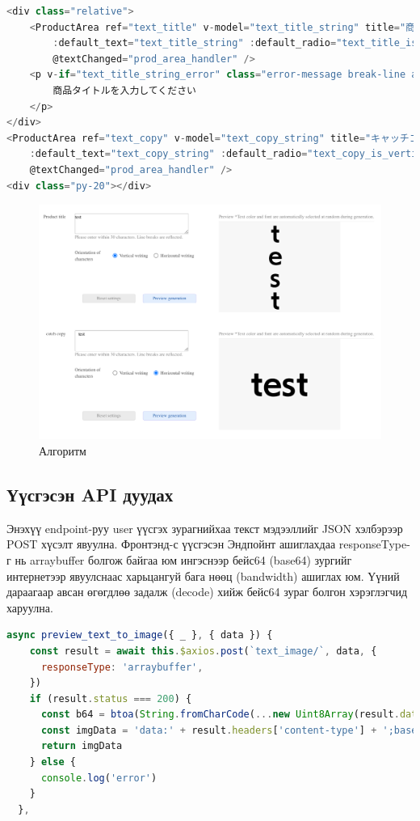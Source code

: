 \begin{lstlisting}[language=JavaScript,caption={ProductArea компонент ашигласан байдал},frame=single]
	<div class="relative">
	<ProductArea ref="text_title" v-model="text_title_string" title="商品タイトル" identifier="1"
		:default_text="text_title_string" :default_radio="text_title_is_vertical"
		@textChanged="prod_area_handler" />
	<p v-if="text_title_string_error" class="error-message break-line absolute top110">
		商品タイトルを入力してください
	</p>
</div>
<ProductArea ref="text_copy" v-model="text_copy_string" title="キャッチコピー" identifier="2"
	:default_text="text_copy_string" :default_radio="text_copy_is_vertical"
	@textChanged="prod_area_handler" />
<div class="py-20"></div>

	\end{lstlisting}
	
	\begin{figure}
		\centering
		\includegraphics[scale=0.3]{src/pictures/front.png}
		\caption{Алгоритм}
	\end{figure}

\subsection{Үүсгэсэн API дуудах}
Энэхүү endpoint-руу user үүсгэх зурагнийхаа текст мэдээллийг JSON хэлбэрээр POST хүсэлт явуулна. Фронтэнд-с үүсгэсэн Эндпойнт ашиглахдаа responseType-г нь arraybuffer болгож байгаа юм ингэснээр бейс64 (base64) зургийг интернетээр явуулснаас харьцангуй бага нөөц (bandwidth) ашиглах юм. Үүний дараагаар авсан өгөгдлөө задалж (decode) хийж бейс64 зураг болгон хэрэглэгчид харуулна.


\begin{lstlisting}[language=JavaScript,caption={Endpoint дуудах function},frame=single]
	async preview_text_to_image({ _ }, { data }) {
    const result = await this.$axios.post(`text_image/`, data, {
      responseType: 'arraybuffer',
    })
    if (result.status === 200) {
      const b64 = btoa(String.fromCharCode(...new Uint8Array(result.data)))
      const imgData = 'data:' + result.headers['content-type'] + ';base64,' + b64
      return imgData
    } else {
      console.log('error')
    }
  },
\end{lstlisting}

